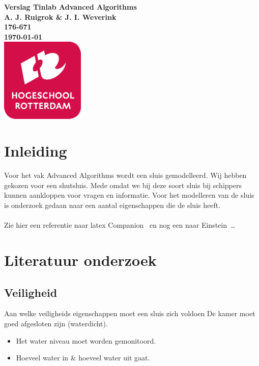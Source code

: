 \documentclass{article}
\begin{document}
\graphicspath{{../Images/}}
\sffamily
\begin{titlepage}
  \centering
    \vfill
    {\bfseries\Huge
      Verslag Tinlab Advanced Algorithms \\
        \vskip2cm
      }
      {\bfseries\Large
        A. J. Ruigrok \& J. I. Weverink\\
      }
      {
        \bfseries\normalsize
        176-671\\
        \vskip1cm
        \today\\
    }
    \vfill
    \includegraphics[width=4cm]{logohr.png} %
    \vfill
    \vfill
\end{titlepage}
\newpage
\tableofcontents

\newpage
\section{Inleiding}
Voor het vak Advanced Algorithms wordt een sluis gemodelleerd. Wij hebben gekozen voor een shutsluis. Mede omdat we bij deze soort sluis bij schippers kunnen aankloppen voor vragen en informatie. Voor het modelleren van de sluis is onderzoek gedaan naar een aantal eigenschappen die de sluis heeft.
\\\\
Zie hier een referentie naar latex Companion~\cite{latexcompanion} en nog een naar Einstein~\cite{einstein}\ldots 

\clearpage

\section{Literatuur onderzoek} %
\subsection{Veiligheid}
Aan welke veiligheids eigenschappen moet een sluis zich voldoen
De kamer moet goed afgesloten zijn (waterdicht).
\begin{itemize}
\item Het water niveau moet worden gemonitoord.
\item Hoeveel water in \& hoeveel water uit gaat.
\end{itemize}
\end{document}
